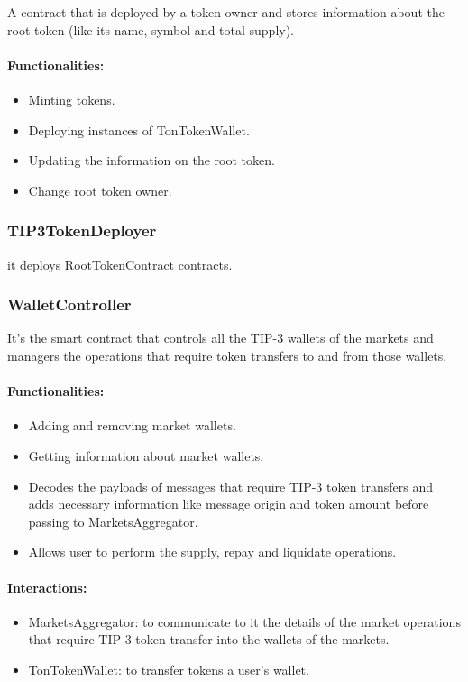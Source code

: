 A contract that is deployed by a token owner and stores information about the root token (like its name, symbol and total supply).

\paragraph*{Functionalities:}
\begin{itemize}
  \item Minting tokens.
  \item Deploying instances of TonTokenWallet.
  \item Updating the information on the root token.
  \item Change root token owner.
\end{itemize}

\subsubsection{TIP3TokenDeployer}

it deploys RootTokenContract contracts.

\subsubsection{WalletController}

It's the smart contract that controls all the TIP-3 wallets of the markets and managers the operations that require token transfers to and from those wallets.

\paragraph*{Functionalities:}
\begin{itemize}
  \item Adding and removing market wallets. 
  \item Getting information about market wallets. 
  \item Decodes the payloads of messages that require TIP-3 token transfers and adds necessary information like message origin and token amount before passing to MarketsAggregator.
  \item Allows user to perform the supply, repay and liquidate operations.
\end{itemize}

\paragraph*{Interactions:}
\begin{itemize}
  \item MarketsAggregator: to communicate to it the details of the market operations that require TIP-3 token transfer into the wallets of the markets.
  \item TonTokenWallet: to transfer tokens a user's wallet.
\end{itemize}

